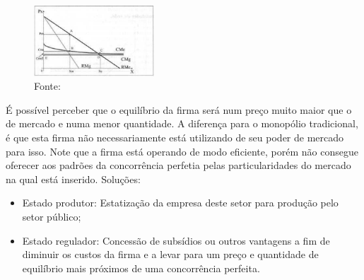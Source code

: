 \documentclass[12pt,a4paper,oneside,brazil]{abntex2}
\begin{document}
\begin{figure}
	\includegraphics[width=0.4\textwidth]{Monopolio Natural.png}
	\centering
	\caption{Fonte: \cite{biderman}}
\end{figure}

É possível perceber que o equilíbrio da firma será num preço muito maior que o de mercado e numa menor quantidade. A diferença para o monopólio tradicional, é que esta firma não necessariamente está utilizando de seu poder de mercado para isso. Note que a firma está operando de modo eficiente, porém não consegue oferecer aos padrões da concorrência perfetia pelas particularidades do mercado na qual está inserido.\newline
Soluções:
\begin{itemize}
\item Estado produtor: Estatização da empresa deste setor para produção pelo setor público;
\item Estado regulador: Concessão de subsídios ou outros vantagens a fim de diminuir os custos da firma e a levar para um preço e quantidade de equilíbrio mais próximos de uma concorrência perfeita.
\end{itemize}
\end{document}
